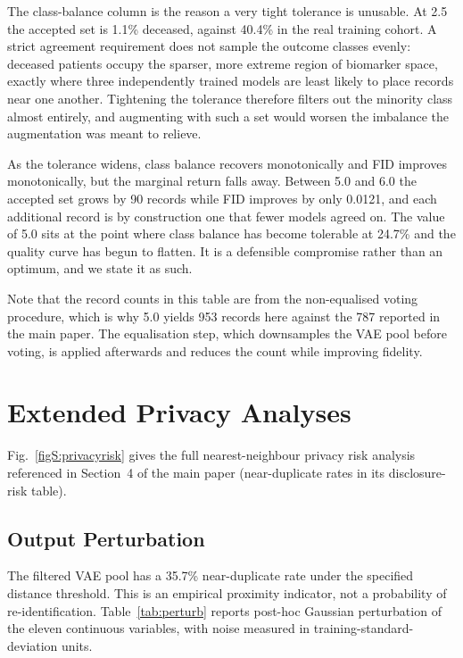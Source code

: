 \documentclass[manuscript,review,screen,nonacm]{acmart}
\newif\ifshowrevisions
\DeclareRobustCommand{\rev}[1]{\ifshowrevisions{\color{revisionblue}#1}\else#1\fi}
\begin{document}
The class-balance column is the reason a very tight tolerance is unusable. At 2.5 the accepted set is 1.1\% deceased, against 40.4\% in the real training cohort. A strict agreement requirement does not sample the outcome classes evenly: deceased patients occupy the sparser, more extreme region of biomarker space, exactly where three independently trained models are least likely to place records near one another. Tightening the tolerance therefore filters out the minority class almost entirely, and augmenting with such a set would worsen the imbalance the augmentation was meant to relieve.

As the tolerance widens, class balance recovers monotonically and FID improves monotonically, but the marginal return falls away. Between 5.0 and 6.0 the accepted set grows by 90 records while FID improves by only 0.0121, and each additional record is by construction one that fewer models agreed on. The value of 5.0 sits at the point where class balance has become tolerable at 24.7\% and the quality curve has begun to flatten. It is a defensible compromise rather than an optimum, and we state it as such.

Note that the record counts in this table are from the non-equalised voting procedure, which is why 5.0 yields 953 records here against the 787 reported in the main paper. The equalisation step, which downsamples the VAE pool before voting, is applied afterwards and reduces the count while improving fidelity.

\section{Extended Privacy Analyses}

\rev{Fig.~\ref{figS:privacyrisk} gives the full nearest-neighbour privacy risk analysis referenced in Section~4 of the main paper (near-duplicate rates in its disclosure-risk table).}

\subsection{Output Perturbation}

\rev{The filtered VAE pool has a 35.7\% near-duplicate rate under the specified distance threshold. This is an empirical proximity indicator, not a probability of re-identification. Table~\ref{tab:perturb} reports post-hoc Gaussian perturbation of the eleven continuous variables, with noise measured in training-standard-deviation units.}
\end{document}
